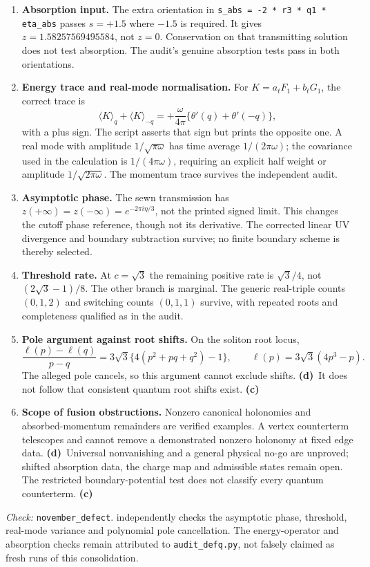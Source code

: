 \documentclass[11pt,a4paper]{article}
\newcommand{\C}{\textbf{(c)}\ }
\newcommand{\D}{\textbf{(d)}\ }
\newcommand{\file}[1]{\nolinkurl{#1}}
\newcommand{\test}[1]{\textit{Check:} \file{#1}.}
\begin{document}
\begin{enumerate}[leftmargin=*]
\item \textbf{Absorption input.} The extra orientation in
\file{s_abs = -2 * r3 * q1 * eta_abs} passes $s=+1.5$ where $-1.5$ is
required. It gives $z=1.58257569495584$, not $z=0$.
Conservation on that transmitting solution does not test absorption.
The audit's genuine absorption tests pass in both orientations.
\item \textbf{Energy trace and real-mode normalisation.} For
$K=a_tF_1+b_tG_1$, the correct trace is
\[
 \langle K\rangle_q+\langle K\rangle_{-q}
 =+\frac{\omega}{4\pi}\{\theta'(q)+\theta'(-q)\},
\]
with a plus sign. The script asserts that sign but prints the opposite one.
A real mode with amplitude $1/\sqrt{\pi\omega}$ has time average
$1/(2\pi\omega)$; the covariance used in the calculation is
$1/(4\pi\omega)$, requiring an explicit half weight or amplitude
$1/\sqrt{2\pi\omega}$. The momentum trace survives the independent audit.
\item \textbf{Asymptotic phase.} The sewn transmission has
$z(+\infty)=z(-\infty)=e^{-2\pi i\eta/3}$, not the printed signed limit.
This changes the cutoff phase reference, though not its derivative.
The corrected linear UV divergence and boundary subtraction survive;
no finite boundary scheme is thereby selected.
\item \textbf{Threshold rate.} At $c=\sqrt3$ the remaining positive rate is
$\sqrt3/4$, not $(2\sqrt3-1)/8$. The other branch is marginal.
The generic real-triple counts $(0,1,2)$ and switching counts $(0,1,1)$
survive, with repeated roots and completeness qualified as in the audit.
\item \textbf{Pole argument against root shifts.} On the soliton root locus,
\[
 \frac{\ell(p)-\ell(q)}{p-q}
 =3\sqrt3\{4(p^2+pq+q^2)-1\},\qquad
 \ell(p)=3\sqrt3(4p^3-p).
\]
The alleged pole cancels, so this argument cannot exclude shifts.
\D It does not follow that consistent quantum root shifts exist. \C
\item \textbf{Scope of fusion obstructions.} Nonzero canonical holonomies
and absorbed-momentum remainders are verified examples. A vertex counterterm
telescopes and cannot remove a demonstrated nonzero holonomy at fixed edge
data. \D Universal nonvanishing and a general physical no-go are unproved;
shifted absorption data, the charge map and admissible states remain open.
The restricted boundary-potential test does not classify every quantum
counterterm. \C
\end{enumerate}
\test{november_defect} independently checks the asymptotic phase, threshold,
real-mode variance and polynomial pole cancellation. The energy-operator and
absorption checks remain attributed to \file{audit_defq.py}, not falsely
claimed as fresh runs of this consolidation.
\end{document}
